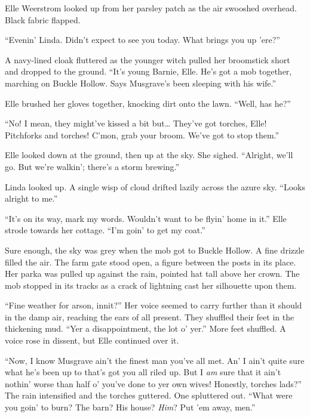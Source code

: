 
Elle Weerstrom looked up from her parsley patch as the air swooshed overhead.
Black fabric flapped.

``Evenin' Linda.
Didn't expect to see you today.
What brings you up 'ere?''

A navy-lined cloak fluttered as the younger witch pulled her broomstick short and dropped to the ground.
``It's young Barnie, Elle.
He's got a mob together, marching on Buckle Hollow.
Says Musgrave's been sleeping with his wife.''

Elle brushed her gloves together, knocking dirt onto the lawn.
``Well, has he?''

``No!
I mean, they might've kissed a bit but{\dots}
They've got torches, Elle!
Pitchforks and torches!
C'mon, grab your broom.
We've got to stop them.''

Elle looked down at the ground, then up at the sky.
She sighed.
``Alright, we'll go.
But we're walkin'; there's a storm brewing.''

Linda looked up.
A single wisp of cloud drifted lazily across the azure sky.
``Looks alright to me.''

``It's on its way, mark my words.
Wouldn't want to be flyin' home in it.''
Elle strode towards her cottage.
``I'm goin' to get my coat.''

\storybreak

Sure enough, the sky was grey when the mob got to Buckle Hollow.
A fine drizzle filled the air.
The farm gate stood open, a figure between the posts in its place.
Her parka was pulled up against the rain, pointed hat tall above her crown.
The mob stopped in its tracks as a crack of lightning cast her silhouette upon them.


``Fine weather for arson, innit?''
Her voice seemed to carry further than it should in the damp air, reaching the ears of all present.
They shuffled their feet in the thickening mud.
``Yer a disappointment, the lot o' yer.''
More feet shuffled.
A voice rose in dissent, but Elle continued over it.

``Now, I know Musgrave ain't the finest man you've all met.
An' I ain't quite sure what he's been up to that's got you all riled up.
But I \emph{am} sure that it ain't nothin' worse than half o' you've done to yer own wives!
Honestly, torches lads?''
The rain intensified and the torches guttered.
One spluttered out.
``What were you goin' to burn?
The barn?
His house?
\emph{Him}?
Put 'em away, men.''

